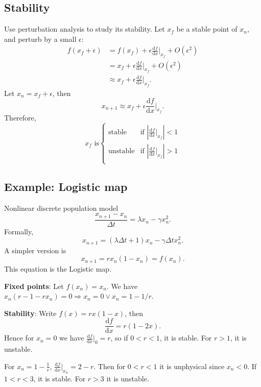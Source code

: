 \documentclass[10pt]{article}
\begin{document}
    \subsection{Stability}
    Use perturbation analysis to study its stability. Let $ x_f $ be a stable point of $x_n$, and perturb by a small $ \epsilon $:
    \[
        \begin{aligned}
            f(x_f+\epsilon)&=f(x_f)+\epsilon \frac{\mathrm{d}f}{\mathrm{d}x}\Big|_{x_f}+O(\epsilon^2) \\
            &= x_f+\epsilon \frac{\mathrm{d}f}{\mathrm{d}x}\Big|_{x_f}+O(\epsilon^2)\\
            &\approx x_f+\epsilon \frac{\mathrm{d}f}{\mathrm{d}x}\Big|_{x_f}.
        \end{aligned}
    \]
    Let $ x_n= x_f+\epsilon$, then 
    \[
        x_{n+1}\approx x_f+\epsilon \frac{\mathrm{d}f}{\mathrm{d}x}\Big|_{x_f}.
    \]
    Therefore,
    \[
        x_f \text{ is} \begin{cases}
        \text{stable} &\text{if } \left| \frac{\mathrm{d}f}{\mathrm{d}x}\Big|_{x_f} \right| <1\\
        \text{unstable} &\text{if }\left| \frac{\mathrm{d}f}{\mathrm{d}x}\Big|_{x_f} \right| >1\\
        \end{cases} 
    \]
    \subsection{Example: Logistic map}
    Nonlinear discrete population model 
    \[
        \frac{x_{n+1}-x_n}{\Delta t}=\lambda x_n-\gamma x_{n}^2
    .\]
    Formally,
    \[
        x_{n+1}=(\lambda \Delta t+1) x_n-\gamma \Delta t x_n^2
    .\]
    A simpler version is 
    \[
        x_{n+1}=rx_n(1-x_n)=f(x_n)
    .\]
    This equation is the Logistic map.
    
    \textbf{Fixed points}: Let $ f(x_n)=x_n $. We have $ x_n(r-1-rx_n)=0 \Rightarrow x_n=0 \lor x_n=1-1/r $.

    \textbf{Stability}: Write $ f(x)=rx(1-x) $, then 
    \[
        \frac{\mathrm{d}f}{\mathrm{d}x}=r(1-2x) 
    .\]
    Hence for $x_n=0$ we have $ \frac{\mathrm{d}f}{\mathrm{d}x}\Big|_0=r $, so if $ 0<r<1 $, it is stable. For $ r>1 $, it is unstable.

    For $ x_n=1-\frac{1}{r} $, $ \frac{\mathrm{d}f}{\mathrm{d}x}\Big|_{x_n}=2-r  $. Then for $ 0<r<1 $ it is unphysical since $x_n<0$. If $ 1<r<3 $, it is stable. For $ r>3 $ it is unstable.
\end{document}

